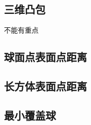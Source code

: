 \documentclass[landscape, twocolumn, 8pt, a4paper, twoside]{extarticle}
\begin{document}
  \subsection{三维凸包}
  不能有重点
  

  \subsection{球面点表面点距离}
  

  \subsection{长方体表面点距离}
  

  \subsection{最小覆盖球}
  
\end{document}
